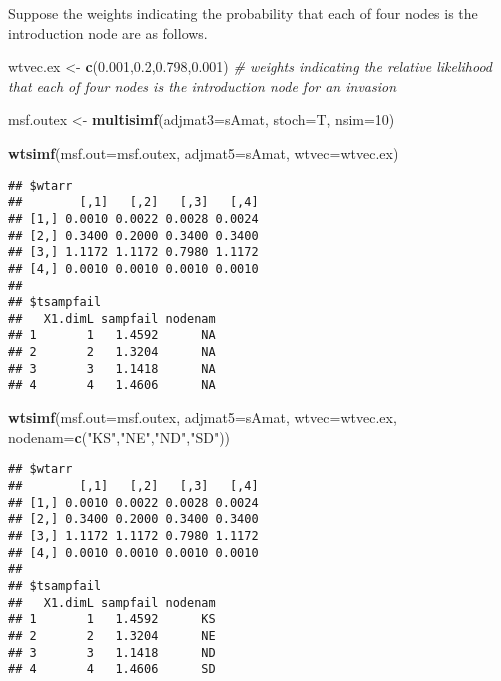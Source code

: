 \documentclass[]{article}
\newenvironment{Shaded}{\begin{snugshade}}{\end{snugshade}}
\newcommand{\KeywordTok}[1]{\textcolor[rgb]{0.13,0.29,0.53}{\textbf{#1}}}
\newcommand{\DataTypeTok}[1]{\textcolor[rgb]{0.13,0.29,0.53}{#1}}
\newcommand{\DecValTok}[1]{\textcolor[rgb]{0.00,0.00,0.81}{#1}}
\newcommand{\FloatTok}[1]{\textcolor[rgb]{0.00,0.00,0.81}{#1}}
\newcommand{\StringTok}[1]{\textcolor[rgb]{0.31,0.60,0.02}{#1}}
\newcommand{\CommentTok}[1]{\textcolor[rgb]{0.56,0.35,0.01}{\textit{#1}}}
\newcommand{\NormalTok}[1]{#1}
\begin{document}
Suppose the weights indicating the probability that each of four nodes
is the introduction node are as follows.

\begin{Shaded}
\begin{Highlighting}[]
\NormalTok{wtvec.ex <-}\StringTok{ }\KeywordTok{c}\NormalTok{(}\FloatTok{0.001}\NormalTok{,}\FloatTok{0.2}\NormalTok{,}\FloatTok{0.798}\NormalTok{,}\FloatTok{0.001}\NormalTok{) }\CommentTok{# weights indicating the relative likelihood that each of four nodes is the introduction node for an invasion }

\NormalTok{msf.outex <-}\StringTok{ }\KeywordTok{multisimf}\NormalTok{(}\DataTypeTok{adjmat3=}\NormalTok{sAmat, }\DataTypeTok{stoch=}\NormalTok{T, }\DataTypeTok{nsim=}\DecValTok{10}\NormalTok{)}

\KeywordTok{wtsimf}\NormalTok{(}\DataTypeTok{msf.out=}\NormalTok{msf.outex, }\DataTypeTok{adjmat5=}\NormalTok{sAmat, }\DataTypeTok{wtvec=}\NormalTok{wtvec.ex)}
\end{Highlighting}
\end{Shaded}

\begin{verbatim}
## $wtarr
##        [,1]   [,2]   [,3]   [,4]
## [1,] 0.0010 0.0022 0.0028 0.0024
## [2,] 0.3400 0.2000 0.3400 0.3400
## [3,] 1.1172 1.1172 0.7980 1.1172
## [4,] 0.0010 0.0010 0.0010 0.0010
## 
## $tsampfail
##   X1.dimL sampfail nodenam
## 1       1   1.4592      NA
## 2       2   1.3204      NA
## 3       3   1.1418      NA
## 4       4   1.4606      NA
\end{verbatim}

\begin{Shaded}
\begin{Highlighting}[]
\KeywordTok{wtsimf}\NormalTok{(}\DataTypeTok{msf.out=}\NormalTok{msf.outex, }\DataTypeTok{adjmat5=}\NormalTok{sAmat, }\DataTypeTok{wtvec=}\NormalTok{wtvec.ex, }\DataTypeTok{nodenam=}\KeywordTok{c}\NormalTok{(}\StringTok{"KS"}\NormalTok{,}\StringTok{"NE"}\NormalTok{,}\StringTok{"ND"}\NormalTok{,}\StringTok{"SD"}\NormalTok{))}
\end{Highlighting}
\end{Shaded}

\begin{verbatim}
## $wtarr
##        [,1]   [,2]   [,3]   [,4]
## [1,] 0.0010 0.0022 0.0028 0.0024
## [2,] 0.3400 0.2000 0.3400 0.3400
## [3,] 1.1172 1.1172 0.7980 1.1172
## [4,] 0.0010 0.0010 0.0010 0.0010
## 
## $tsampfail
##   X1.dimL sampfail nodenam
## 1       1   1.4592      KS
## 2       2   1.3204      NE
## 3       3   1.1418      ND
## 4       4   1.4606      SD
\end{verbatim}
\end{document}

